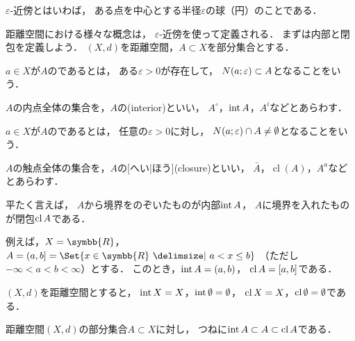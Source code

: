 \documentclass[../sotsu.tex]{subfiles}
\begin{document}
$\varepsilon$-近傍とはいわば，
ある点を中心とする半径$\varepsilon$の球（円）のことである．

距離空間における様々な概念は，
$\varepsilon$-近傍を使って定義される．
まずは内部と閉包を定義しよう．
$(X, d)$を距離空間，$A \subset X$を部分集合とする．

\begin{definition}
    \label{dfn:interior}
    $a \in X$が$A$のであるとは，
    ある$\varepsilon > 0$が存在して，
    $N(a; \varepsilon) \subset A$となることをいう．

    $A$の内点全体の集合を，$A$の(interior)といい，
    $A^\circ$，$\operatorname{int}{A}$，$A^i$などとあらわす．
\end{definition}

\begin{definition}
    \label{dfn:closure}
    $a \in X$が$A$のであるとは，
    任意の$\varepsilon > 0$に対し，
    $N(a; \varepsilon) \cap A \neq \emptyset$となることをいう．

    $A$の触点全体の集合を，$A$の[へい|ほう](closure)といい，
    $\bar{A}$，$\operatorname{cl}(A)$，$A^a$などとあらわす．
\end{definition}

平たく言えば，
$A$から境界をのぞいたものが内部$\operatorname{int}{A}$，
$A$に境界を入れたものが閉包$\operatorname{cl}{A}$である．

例えば，$X = \symbb{R}$，
$A = (a, b] = \Set{ x \in \symbb{R} \given a < x \leq b }$
（ただし$-\infty < a < b < \infty$）とする．
このとき，$\operatorname{int}{A} = (a, b)$，
$\operatorname{cl}{A} = [a, b]$である．


\begin{example}
    \label{thm:interior-and-closure-of-emptyset}
    $(X, d)$を距離空間とすると，
    $\operatorname{int}{X} = X$，$\operatorname{int}{\emptyset} = \emptyset$，
    $\operatorname{cl}{X} = X$，$\operatorname{cl}{\emptyset} = \emptyset$である．
\end{example}



\begin{proposition}
    \label{thm:interior-closure-inclusion}
    距離空間$(X, d)$の部分集合$A \subset X$に対し，
    つねに$\operatorname{int}{A} \subset A \subset \operatorname{cl}{A}$である．
\end{proposition}
\end{document}
